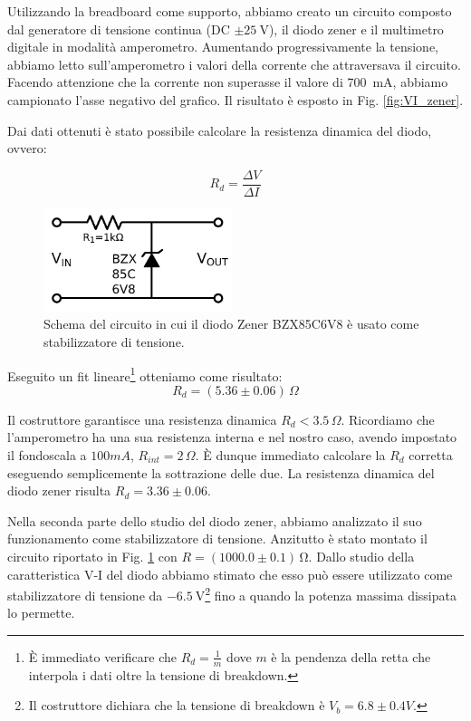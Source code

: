 Utilizzando la breadboard come supporto, abbiamo creato un circuito composto dal generatore di tensione continua (DC $\pm \SI{25}{\volt}$), il diodo zener e il multimetro digitale in modalità amperometro. Aumentando progressivamente la tensione, abbiamo letto sull'amperometro i valori della corrente che attraversava il circuito.
Facendo attenzione che la corrente non superasse il valore di \SI{700}{\milli\ampere}, abbiamo campionato l'asse negativo del grafico. Il risultato è esposto in Fig. \ref{fig:VI_zener}.

Dai dati ottenuti è stato possibile calcolare la resistenza dinamica del diodo, ovvero:

\begin{equation}
R_d=\frac{\Delta V}{\Delta I}
\label{scemopagliaccio}
\end{equation}

\begin{figure}
	\includegraphics[width=55mm]{schema_zener.pdf}
	\caption{Schema del circuito in cui il diodo Zener BZX85C6V8 è usato come stabilizzatore di tensione.}
	\label{fig:schema_zener}
\end{figure}

Eseguito un fit lineare\footnote{È immediato verificare che $R_d=\frac{1}{m}$ dove $m$ è la pendenza della retta che interpola i dati oltre la tensione di breakdown.} otteniamo come risultato:
$$R_d= (5.36 \pm 0.06)\,\Omega$$

Il costruttore garantisce una resistenza dinamica $R_d<3.5 \, \Omega$. Ricordiamo che l'amperometro ha una sua resistenza interna e nel nostro caso, avendo impostato il fondoscala a $100mA$, $R_{int}=2\, \Omega$. È dunque immediato calcolare la $R_d$ corretta eseguendo semplicemente la sottrazione delle due. La resistenza dinamica del diodo zener risulta $R_d=3.36 \pm 0.06$.

Nella seconda parte dello studio del diodo zener, abbiamo analizzato il suo funzionamento come stabilizzatore di tensione. Anzitutto è stato montato il circuito riportato in Fig. \ref{fig:schema_zener} con $R = (1000.0 \pm 0.1) \, \si{\ohm}$.  Dallo studio della caratteristica V-I del diodo abbiamo stimato che esso può essere utilizzato come stabilizzatore di tensione da $\SI{-6.5}{\volt}$\footnote{Il costruttore dichiara che la tensione di breakdown è $V_b=6.8 \pm 0.4 V$.} fino a quando la potenza massima dissipata lo permette. 

